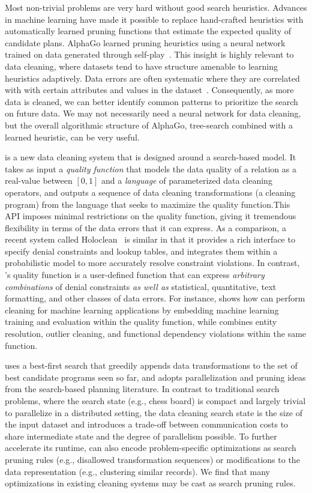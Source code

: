 Most non-trivial problems are very hard without good search heuristics.
Advances in machine learning have made it possible to replace hand-crafted heuristics with automatically learned pruning functions that estimate the expected quality of candidate plans. AlphaGo learned pruning heuristics using a neural network trained on data generated through self-play~\cite{silver2016mastering}.
This insight is highly relevant to data cleaning, where datasets tend to have structure amenable to learning heuristics adaptively.
Data errors are often systematic where they are correlated with with certain attributes and values in the dataset~\cite{rekatsinas2017holoclean,DBLP:journals/pvldb/KrishnanWWFG16}.
Consequently, as more data is cleaned, we can better identify common patterns to prioritize the search on future data.
We may not necessarily need a neural network for data cleaning, but the overall algorithmic structure of AlphaGo, tree-search combined with a learned heuristic, can be very useful.

\sys is a new data cleaning system that is designed around a search-based model. It takes as input a {\it quality function} that models the data quality of a relation as a real-value between $[0,1]$ and a {\it language} of parameterized data cleaning operators, and outputs a sequence of data cleaning transformations (a cleaning program) from the language that seeks to maximize the quality function.This API imposes minimal restrictions on the quality function, giving it tremendous flexibility in terms of the data errors that it can express.   As a comparison, a recent system called Holoclean~\cite{rekatsinas2017holoclean} is similar in that it provides a rich interface to specify denial constraints and lookup tables, and integrates them within a probabilistic model to more accurately resolve constraint violations.  In contrast, \sys's quality function is a user-defined function that can express {\it arbitrary combinations} of denial constraints {\it as well as} statistical, quantitative, text formatting, and other classes of data errors.  For instance,  shows how \sys can perform cleaning for machine learning applications by embedding machine learning training and evaluation within the quality function, while  combines entity resolution, outlier cleaning, and functional dependency violations within the same function.  


\sys uses a best-first search that greedily appends data transformations to the set of best candidate programs seen so far, and adopts parallelization and pruning ideas from the search-based planning literature.  In contrast to traditional search problems, where the search state (e.g., chess board) is compact and largely trivial to parallelize in a distributed setting, the data cleaning search state is the size of the input dataset and introduces a trade-off between communication costs to share intermediate state and the degree of parallelism possible.  
To further accelerate its runtime, \sys can also encode problem-specific optimizations as search pruning rules (e.g., disallowed transformation sequences) or modifications to the data representation (e.g., clustering similar records).  We find that many optimizations in existing cleaning systems may be cast as search pruning rules.

